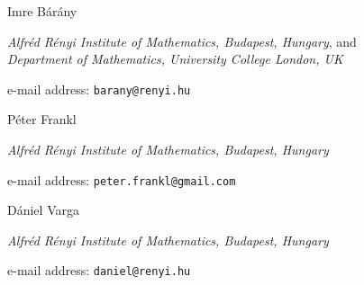 \documentclass[11pt,a4paper]{amsart}
\begin{document}
\noindent
{\sc Imre Bárány}
\smallskip

\noindent
{\em Alfréd Rényi Institute of Mathematics, Budapest, Hungary}, and \\
{\em Department of Mathematics, University College London, UK}
\smallskip

\noindent
e-mail address: \texttt{barany@renyi.hu}
\bigskip

\noindent
{\sc P\'eter Frankl}
\smallskip

\noindent
{\em Alfréd Rényi Institute of Mathematics, Budapest, Hungary }
\smallskip

\noindent
e-mail address: \texttt{peter.frankl@gmail.com}
\bigskip

\noindent
{\sc Dániel Varga}
\smallskip

\noindent
{\em Alfréd Rényi Institute of Mathematics, Budapest, Hungary }
\smallskip

\noindent
e-mail address: \texttt{daniel@renyi.hu}


\end{document}
